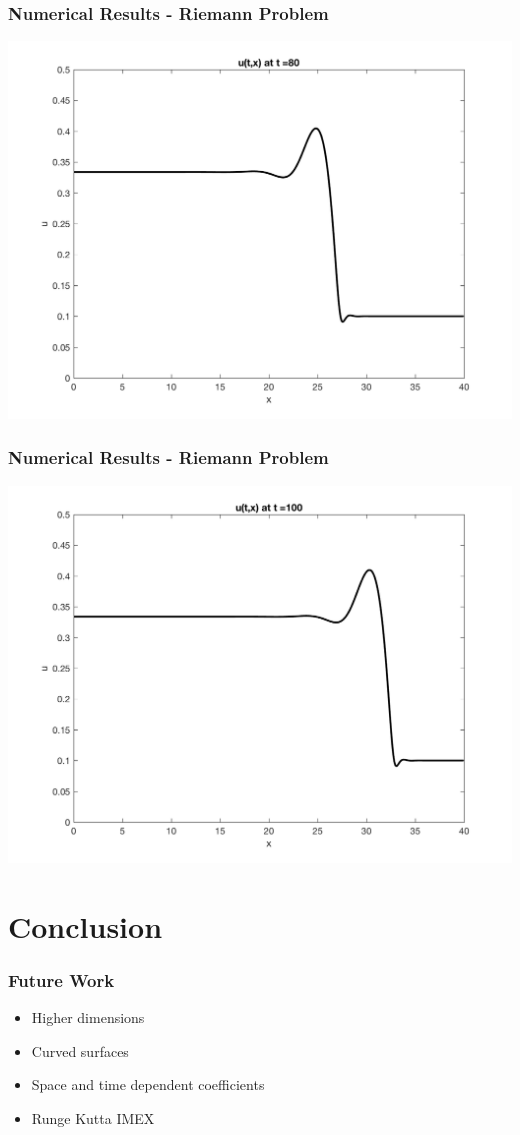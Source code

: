 \documentclass[10pt]{beamer}
\begin{document}
    \begin{frame}
      \frametitle{Numerical Results - Riemann Problem}
      \begin{center}
        \includegraphics[scale=0.5]{Figures/reimann80.png}
      \end{center}
    \end{frame}
    \begin{frame}
      \frametitle{Numerical Results - Riemann Problem}
      \begin{center}
        \includegraphics[scale=0.5]{Figures/reimann100.png}
      \end{center}
    \end{frame}

  \section{Conclusion}
    \begin{frame}
      \frametitle{Future Work}
      \begin{itemize}
        \item Higher dimensions
        \item Curved surfaces
        \item Space and time dependent coefficients
        \item Runge Kutta IMEX
      \end{itemize}
    \end{frame}
\end{document}
